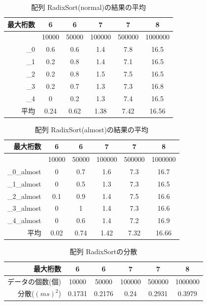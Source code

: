 \documentclass[a4j,dvipdfmx]{jsreport}
\begin{document}
\begin{table}[hbtp]
\caption{配列 RadixSort(normal)の結果の平均}
\label{table:data_type}
\centering
\begin{tabular}{|r||cc|cc|c|}
\hline
最大桁数 & 6 & 6 & 7 & 7 & 8 \\ \hline \hline
 & 10000 & 50000 & 100000 & 500000 & 1000000 \\ \hline
\_0 & 0.6 & 0.6 & 1.4 & 7.8 & 16.5 \\
\_1 & 0.2 & 0.8 & 1.4 & 7.1 & 16.5 \\
\_2 & 0.2 & 0.8 & 1.5 & 7.5 & 16.5 \\
\_3 & 0.2 & 0.7 & 1.3 & 7.3 & 16.8 \\
\_4 & 0 & 0.2 & 1.3 & 7.4 & 16.5 \\ \hline
平均 & 0.24 & 0.62 & 1.38 & 7.42 & 16.56 \\
\hline
\end{tabular}
\end{table}

\begin{table}[hbtp]
\caption{配列 RadixSort(almost)の結果の平均}
\label{table:data_type}
\centering
\begin{tabular}{|r||cc|cc|c|}
\hline
最大桁数 & 6 & 6 & 7 & 7 & 8 \\ \hline \hline
 & 10000 & 50000 & 100000 & 500000 & 1000000 \\ \hline
\_0\_almost & 0 & 0.7 & 1.6 & 7.3 & 16.7 \\
\_1\_almost & 0 & 0.5 & 1.3 & 7.3 & 16.5 \\
\_2\_almost & 0.1 & 0.9 & 1.4 & 7.5 & 16.6 \\
\_3\_almost & 0 & 1 & 1.4 & 7.3 & 16.6 \\
\_4\_almost & 0 & 0.6 & 1.4 & 7.2 & 16.9 \\ \hline
平均 & 0.02 & 0.74 & 1.42 & 7.32 & 16.66 \\

\hline
\end{tabular}
\end{table}

\begin{table}[hbtp]
\caption{配列 RadixSortの分散}
\label{table:data_type}
\centering
\begin{tabular}{|r||cc|cc|c|}
\hline
最大桁数 & 6 & 6 & 7 & 7 & 8 \\ \hline \hline
データの個数(個) & 10000 & 50000 & 100000 & 500000 & 1000000 \\ \hline
分散($(ms)^2$) & 0.1731 & 0.2176 & 0.24 & 0.2931 & 0.3979 \\
\hline
\end{tabular}
\end{table}
\end{document}
